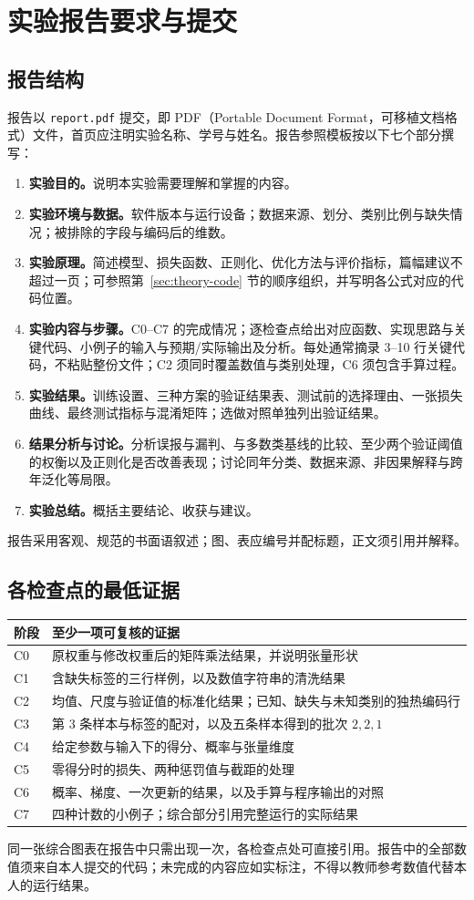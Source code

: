 \documentclass[UTF8,a4paper,11pt,fontset=fandol]{ctexart}
\begin{document}
\section{实验报告要求与提交}
\subsection{报告结构}
报告以 \texttt{report.pdf} 提交，即 PDF（Portable Document Format，可移植文档格式）文件，首页应注明实验名称、学号与姓名。报告参照模板按以下七个部分撰写：
\begin{enumerate}
\item \textbf{实验目的。}说明本实验需要理解和掌握的内容。
\item \textbf{实验环境与数据。}软件版本与运行设备；数据来源、划分、类别比例与缺失情况；被排除的字段与编码后的维数。
\item \textbf{实验原理。}简述模型、损失函数、正则化、优化方法与评价指标，篇幅建议不超过一页；可参照第~\ref{sec:theory-code} 节的顺序组织，并写明各公式对应的代码位置。
\item \textbf{实验内容与步骤。}C0--C7 的完成情况；逐检查点给出对应函数、实现思路与关键代码、小例子的输入与预期/实际输出及分析。每处通常摘录 3--10 行关键代码，不粘贴整份文件；C2 须同时覆盖数值与类别处理，C6 须包含手算过程。
\item \textbf{实验结果。}训练设置、三种方案的验证结果表、测试前的选择理由、一张损失曲线、最终测试指标与混淆矩阵；选做对照单独列出验证结果。
\item \textbf{结果分析与讨论。}分析误报与漏判、与多数类基线的比较、至少两个验证阈值的权衡以及正则化是否改善表现；讨论同年分类、数据来源、非因果解释与跨年泛化等局限。
\item \textbf{实验总结。}概括主要结论、收获与建议。
\end{enumerate}
报告采用客观、规范的书面语叙述；图、表应编号并配标题，正文须引用并解释。
\subsection{各检查点的最低证据}
\par\noindent\begin{tabularx}{\linewidth}{L{1.3cm}Y}\toprule
阶段 & 至少一项可复核的证据\\\midrule
C0 & 原权重与修改权重后的矩阵乘法结果，并说明张量形状\\
C1 & 含缺失标签的三行样例，以及数值字符串的清洗结果\\
C2 & 均值、尺度与验证值的标准化结果；已知、缺失与未知类别的独热编码行\\
C3 & 第 3 条样本与标签的配对，以及五条样本得到的批次 $2,2,1$\\
C4 & 给定参数与输入下的得分、概率与张量维度\\
C5 & 零得分时的损失、两种惩罚值与截距的处理\\
C6 & 概率、梯度、一次更新的结果，以及手算与程序输出的对照\\
C7 & 四种计数的小例子；综合部分引用完整运行的实际结果\\\bottomrule
\end{tabularx}
同一张综合图表在报告中只需出现一次，各检查点处可直接引用。报告中的全部数值须来自本人提交的代码；未完成的内容应如实标注，不得以教师参考数值代替本人的运行结果。
\clearpage
\end{document}
